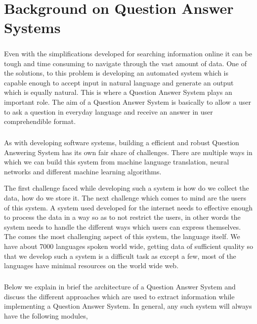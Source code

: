 \chapter{Background on Question Answer Systems}

\paragraph{}
Even with the simplifications developed for searching information online it can be tough and time consuming to navigate through the vast amount of data. One of the solutions, to this problem is developing an automated system which is capable enough to accept input in natural language and generate an output which is equally natural. This is where a Question Answer System plays an important role. The aim of a Question Answer System is basically to allow a user to ask a question in everyday language and receive an answer in user comprehendible format. 

\paragraph{}
As with developing software systems, building a efficient and robust Question Answering System has its own fair share of challenges. There are multiple ways in which we can build this system from  machine language translation, neural networks and different machine learning algorithms.

The first challenge faced while developing such a system is how do we collect the data, how do we store it. The next challenge which comes to mind are the users of this system. A system used developed for the internet needs to effective enough to process the data in a way so as to not restrict the users, in other words the system needs to handle the different ways which users can express themselves. The comes the most challenging aspect of this system, the language itself. We have about 7000 languages spoken world wide, getting data of sufficient quality so that we develop such a system is a difficult task as except a few, most of the languages have minimal resources on the world wide web.
 
\paragraph{}
Below we explain in brief the architecture of a Question Answer System and discuss the different approaches which are used to extract information while implementing a Question Answer System. In general, any such system will always have the following modules,

